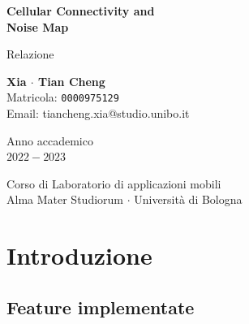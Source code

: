 \documentclass[11pt]{article}
\begin{document}
\begin{titlepage}
    \begin{center}
        \vspace*{5cm}
            
        \Huge
        \textbf{Cellular Connectivity and\\Noise Map}
            
        \vspace{0.5cm}
        \LARGE
        Relazione
            
        \vspace{1cm}
          
		\hfill
		\begin{center}
        	{\large{\bf Xia $\cdot$ Tian Cheng}}\\[-0.2em]
			{\large Matricola: \texttt{0000975129}}\\[-0.2em]
			{\large Email: tiancheng.xia@studio.unibo.it}
        \end{center}
            
        \vspace{4cm}
            
        Anno accademico\\
        $2022 - 2023$
            
        \vspace{0.8cm}
            
            
        \Large
        Corso di Laboratorio di applicazioni mobili\\
        Alma Mater Studiorum $\cdot$ Università di Bologna\\
            
    \end{center}
\end{titlepage}
\newpage

\tableofcontents
\newpage



\section{Introduzione}

\subsection{Feature implementate}
\end{document}
